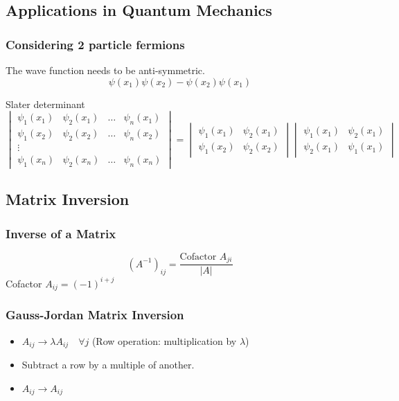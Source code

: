\documentclass[11pt, a4paper]{report}
\begin{document}
\subsection{Applications in Quantum Mechanics}
\subsubsection{Considering 2 particle fermions}
The wave function needs to be anti-symmetric.
$$
\psi(x_1) \psi(x_2) - \psi(x_2) \psi(x_1)
$$

Slater determinant
$$
\begin{vmatrix}
\psi_1(x_1) & \psi_2(x_1) & \dots & \psi_n(x_1) \\
\psi_1(x_2) & \psi_2(x_2) & \dots & \psi_n(x_2) \\
\vdots \\
\psi_1(x_n) & \psi_2(x_n) & \dots & \psi_n(x_n)
\end{vmatrix}
=
\begin{vmatrix}
\psi_1(x_1) & \psi_2(x_1) \\
\psi_1(x_2) & \psi_2(x_2)
\end{vmatrix}
\begin{vmatrix}
\psi_1(x_1) & \psi_2(x_1) \\
\psi_2(x_1) & \psi_1(x_1)
\end{vmatrix}
$$

\subsection{Matrix Inversion}
\subsubsection{Inverse of a Matrix}
$$
(A^{-1})_{ij} = \frac{\text{Cofactor } A_{ji}}{|A|}
$$
Cofactor $A_{ij} = (-1)^{i+j}$

\subsubsection{Gauss-Jordan Matrix Inversion}
\begin{itemize}
    \item $A_{ij} \to \lambda A_{ij} \quad \forall j$ (Row operation: multiplication by $\lambda$)
    \item Subtract a row by a multiple of another.
    \item $A_{ij} \to A_{ij}$
\end{itemize}
\end{document}
